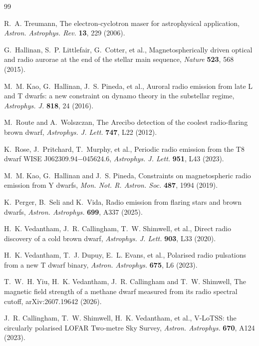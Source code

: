 \documentclass[3p,11pt]{elsarticle}
\begin{document}
\begin{thebibliography}{99}\small\raggedright
\setlength{\itemsep}{1pt}

R.~A. Treumann, The electron-cyclotron maser for astrophysical application,
\emph{Astron. Astrophys. Rev.} \textbf{13}, 229 (2006).

G.~Hallinan, S.~P. Littlefair, G.~Cotter, et al., Magnetospherically driven optical and
radio aurorae at the end of the stellar main sequence, \emph{Nature} \textbf{523}, 568
(2015).

M.~M. Kao, G.~Hallinan, J.~S. Pineda, et al., Auroral radio emission from late L and T
dwarfs: a new constraint on dynamo theory in the substellar regime, \emph{Astrophys. J.}
\textbf{818}, 24 (2016).

M.~Route and A.~Wolszczan, The Arecibo detection of the coolest radio-flaring brown
dwarf, \emph{Astrophys. J. Lett.} \textbf{747}, L22 (2012).

K.~Rose, J.~Pritchard, T.~Murphy, et al., Periodic radio emission from the T8 dwarf
WISE J062309.94$-$045624.6, \emph{Astrophys. J. Lett.} \textbf{951}, L43 (2023).

M.~M. Kao, G.~Hallinan and J.~S. Pineda, Constraints on magnetospheric radio emission
from Y dwarfs, \emph{Mon. Not. R. Astron. Soc.} \textbf{487}, 1994 (2019).

K.~Perger, B.~Seli and K.~Vida, Radio emission from flaring stars and brown dwarfs,
\emph{Astron. Astrophys.} \textbf{699}, A337 (2025).

H.~K. Vedantham, J.~R. Callingham, T.~W. Shimwell, et al., Direct radio discovery of a
cold brown dwarf, \emph{Astrophys. J. Lett.} \textbf{903}, L33 (2020).

H.~K. Vedantham, T.~J. Dupuy, E.~L. Evans, et al., Polarised radio pulsations from a new
T dwarf binary, \emph{Astron. Astrophys.} \textbf{675}, L6 (2023).

T.~W.~H. Yiu, H.~K. Vedantham, J.~R. Callingham and T.~W. Shimwell, The magnetic field
strength of a methane dwarf measured from its radio spectral cutoff, arXiv:2607.19642
(2026).

J.~R. Callingham, T.~W. Shimwell, H.~K. Vedantham, et al., V-LoTSS: the circularly
polarised LOFAR Two-metre Sky Survey, \emph{Astron. Astrophys.} \textbf{670}, A124
(2023).


\end{thebibliography}
\end{document}
